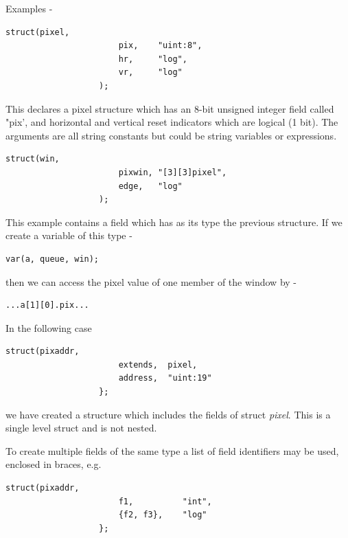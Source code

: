                 Examples -
                \begin{lstlisting}[gobble=16, language=threepl]
                   struct(pixel,
                       pix,    "uint:8",
                       hr,     "log",
                       vr,     "log"
                   );
                \end{lstlisting}
                This declares a pixel structure which has an 8-bit unsigned
                integer field called "pix', and horizontal and vertical reset
                indicators which are logical (1 bit). The arguments are all
                string constants but could be string variables or expressions.
                \begin{lstlisting}[gobble=16, language=threepl]
                   struct(win,
                       pixwin, "[3][3]pixel",
                       edge,   "log"
                   );
                \end{lstlisting}
                This example contains a field which has as its type the
                previous structure. If we create a variable of this type -
                \begin{lstlisting}[gobble=16, language=threepl]
                   var(a, queue, win);
                \end{lstlisting}
                then we can access the pixel value of one member of the window
                by -
                \begin{lstlisting}[gobble=16, language=threepl]
                   ...a[1][0].pix...
                \end{lstlisting}

                In the following case
                \begin{lstlisting}[gobble=16, language=threepl]
                   struct(pixaddr,
                       extends,  pixel,
                       address,  "uint:19"
                   };
                \end{lstlisting}
                we have created a structure which includes the fields of struct
                {\em pixel}. This is a single level struct and is not nested.

                To create multiple fields of the same type a list of field
                identifiers may be used, enclosed in braces, e.g.
                \begin{lstlisting}[gobble=16, language=threepl]
                   struct(pixaddr,
                       f1,          "int",
                       {f2, f3},    "log"
                   };
                \end{lstlisting}

